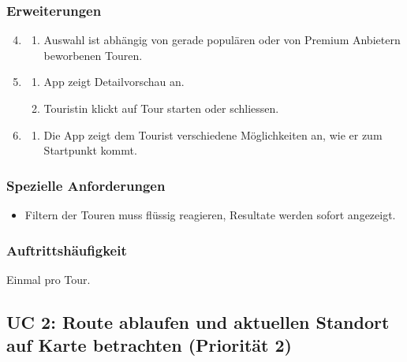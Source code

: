 \documentclass[a4paper,10pt,xetex]{article}
\begin{document}
\subsubsection{Erweiterungen}\label{erweiterungen}
\begin{enumerate}
  \setcounter{enumi}{3}
  \item
    \begin{enumerate}
      \item Auswahl ist abhängig von gerade populären oder von Premium Anbietern beworbenen Touren.
    \end{enumerate}

  \setcounter{enumi}{6}
  \item
    \begin{enumerate}
      \item App zeigt Detailvorschau an.
      \item Touristin klickt auf Tour starten oder schliessen.
    \end{enumerate}

  \setcounter{enumi}{8}
  \item
    \begin{enumerate}
      \item Die App zeigt dem Tourist verschiedene Möglichkeiten an, wie er zum Startpunkt kommt.
    \end{enumerate}
\end{enumerate}


\subsubsection{Spezielle Anforderungen}\label{spezielle-anforderungen}
\begin{itemize}
  \item Filtern der Touren muss flüssig reagieren, Resultate werden sofort angezeigt.
\end{itemize}


\subsubsection{Auftrittshäufigkeit}\label{auftrittshuxe4ufigkeit}
Einmal pro Tour.


\subsection{UC 2: Route ablaufen und aktuellen Standort auf Karte betrachten (Priorität 2)}\label{uc-2-user-luxe4uft-route-ab-und-sieht-seine-aktuellen-standort-auf-einer-karte-priorituxe4t-2}
\end{document}
